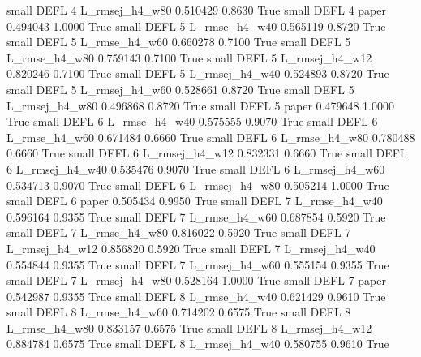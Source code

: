      small     DEFL                 4 L_rmsej_h4_w80   0.510429      0.8630    True
     small     DEFL                 4          paper   0.494043      1.0000    True
     small     DEFL                 5  L_rmse_h4_w40   0.565119      0.8720    True
     small     DEFL                 5  L_rmse_h4_w60   0.660278      0.7100    True
     small     DEFL                 5  L_rmse_h4_w80   0.759143      0.7100    True
     small     DEFL                 5 L_rmsej_h4_w12   0.820246      0.7100    True
     small     DEFL                 5 L_rmsej_h4_w40   0.524893      0.8720    True
     small     DEFL                 5 L_rmsej_h4_w60   0.528661      0.8720    True
     small     DEFL                 5 L_rmsej_h4_w80   0.496868      0.8720    True
     small     DEFL                 5          paper   0.479648      1.0000    True
     small     DEFL                 6  L_rmse_h4_w40   0.575555      0.9070    True
     small     DEFL                 6  L_rmse_h4_w60   0.671484      0.6660    True
     small     DEFL                 6  L_rmse_h4_w80   0.780488      0.6660    True
     small     DEFL                 6 L_rmsej_h4_w12   0.832331      0.6660    True
     small     DEFL                 6 L_rmsej_h4_w40   0.535476      0.9070    True
     small     DEFL                 6 L_rmsej_h4_w60   0.534713      0.9070    True
     small     DEFL                 6 L_rmsej_h4_w80   0.505214      1.0000    True
     small     DEFL                 6          paper   0.505434      0.9950    True
     small     DEFL                 7  L_rmse_h4_w40   0.596164      0.9355    True
     small     DEFL                 7  L_rmse_h4_w60   0.687854      0.5920    True
     small     DEFL                 7  L_rmse_h4_w80   0.816022      0.5920    True
     small     DEFL                 7 L_rmsej_h4_w12   0.856820      0.5920    True
     small     DEFL                 7 L_rmsej_h4_w40   0.554844      0.9355    True
     small     DEFL                 7 L_rmsej_h4_w60   0.555154      0.9355    True
     small     DEFL                 7 L_rmsej_h4_w80   0.528164      1.0000    True
     small     DEFL                 7          paper   0.542987      0.9355    True
     small     DEFL                 8  L_rmse_h4_w40   0.621429      0.9610    True
     small     DEFL                 8  L_rmse_h4_w60   0.714202      0.6575    True
     small     DEFL                 8  L_rmse_h4_w80   0.833157      0.6575    True
     small     DEFL                 8 L_rmsej_h4_w12   0.884784      0.6575    True
     small     DEFL                 8 L_rmsej_h4_w40   0.580755      0.9610    True
